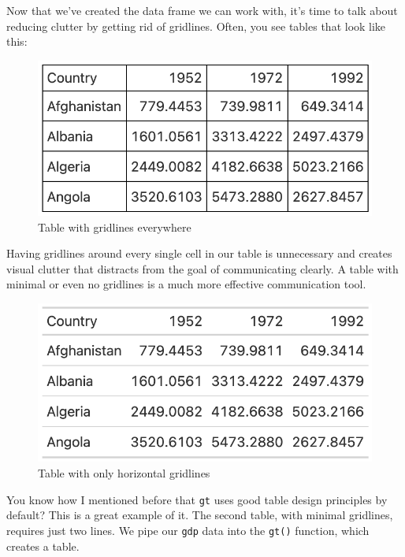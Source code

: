 \documentclass[
]{book}
\begin{document}
Now that we've created the data frame we can work with, it's time to talk about reducing clutter by getting rid of gridlines. Often, you see tables that look like this:

\begin{figure}
\includegraphics[width=1\linewidth]{nostarch/temp/F05001} \caption{Table with gridlines everywhere}\label{fig:unnamed-chunk-6}
\end{figure}

Having gridlines around every single cell in our table is unnecessary and creates visual clutter that distracts from the goal of communicating clearly. A table with minimal or even no gridlines is a much more effective communication tool.

\begin{figure}
\includegraphics[width=1\linewidth]{nostarch/temp/F05002} \caption{Table with only horizontal gridlines}\label{fig:table-horizontal-gridlines}
\end{figure}

You know how I mentioned before that \texttt{gt} uses good table design principles by default? This is a great example of it. The second table, with minimal gridlines, requires just two lines. We pipe our \texttt{gdp} data into the \texttt{gt()} function, which creates a table.
\end{document}
